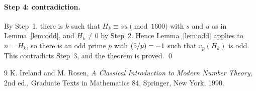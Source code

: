 \documentclass[11pt]{article}
\newcommand{\leg}[2]{\mathchoice{\biggl(\dfrac{#1}{#2}\biggr)}{(#1/#2)}{(#1/#2)}{(#1/#2)}}
\begin{document}
\paragraph{Step 4: contradiction.} By Step~1, there is $k$ such that $H_k\equiv su\pmod{1600}$ with $s$ and $u$ as in Lemma~\ref{lem:odd}, and $H_k\neq0$ by Step~2. Hence Lemma~\ref{lem:odd} applies to $n=H_k$, so there is an odd prime $p$ with $\leg{5}{p}=-1$ such that $v_p(H_k)$ is odd. This contradicts Step~3, and the theorem is proved.
\qed

\begin{thebibliography}{9}
 K. Ireland and M. Rosen, \emph{A Classical Introduction to Modern Number Theory}, 2nd ed., Graduate Texts in Mathematics 84, Springer, New York, 1990.
\end{thebibliography}
\end{document}
